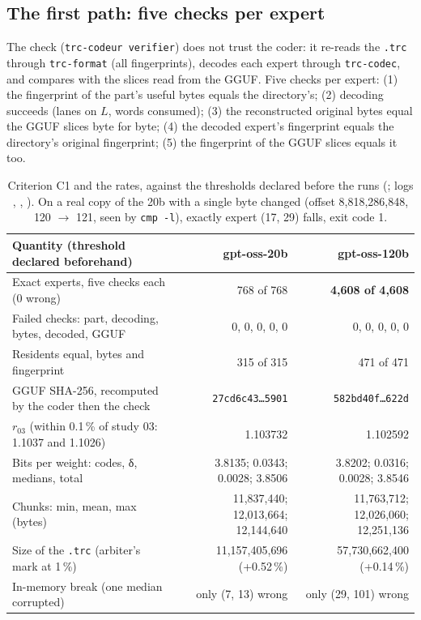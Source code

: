 \subsection{The first path: five checks per expert}

The check (\texttt{trc-codeur verifier}) does not trust the coder: it re-reads the \texttt{.trc} through \texttt{trc-format} (all fingerprints), decodes each expert through \texttt{trc-codec}, and compares with the slices read from the GGUF. Five checks per expert: (1) the fingerprint of the part's useful bytes equals the directory's; (2) decoding succeeds (lanes on $L$, words consumed); (3) the reconstructed original bytes equal the GGUF slices byte for byte; (4) the decoded expert's fingerprint equals the directory's original fingerprint; (5) the fingerprint of the GGUF slices equals it too.

\begin{table}[ht]
\centering\small
\begin{tabularx}{\linewidth}{>{\raggedright\arraybackslash}X r r}
\toprule
Quantity (threshold declared beforehand) & gpt-oss-20b & gpt-oss-120b \\
\midrule
Exact experts, five checks each (0 wrong) & 768 of 768 & \textbf{4{,}608 of 4{,}608} \\
Failed checks: part, decoding, bytes, decoded, GGUF & 0, 0, 0, 0, 0 & 0, 0, 0, 0, 0 \\
Residents equal, bytes and fingerprint & 315 of 315 & 471 of 471 \\
GGUF SHA-256, recomputed by the coder then the check & \texttt{27cd6c43…5901} & \texttt{582bd40f…622d} \\
$r_{03}$ (within 0.1\,\% of study 03: 1.1037 and 1.1026) & 1.103732 & 1.102592 \\
Bits per weight: codes, δ, medians, total & 3.8135; 0.0343; 0.0028; 3.8506 & 3.8202; 0.0316; 0.0028; 3.8546 \\
Chunks: min, mean, max (bytes) & 11{,}837{,}440; 12{,}013{,}664; 12{,}144{,}640 & 11{,}763{,}712; 12{,}026{,}060; 12{,}251{,}136 \\
Size of the \texttt{.trc} (arbiter's mark at 1\,\%) & 11{,}157{,}405{,}696 (+0.52\,\%) & 57{,}730{,}662{,}400 (+0.14\,\%) \\
In-memory break (one median corrupted) & only (7, 13) wrong & only (29, 101) wrong \\
\bottomrule
\end{tabularx}
\caption[C1: the verdict]{Criterion C1 and the rates, against the thresholds declared before the runs (; logs , , ). On a real copy of the 20b with a single byte changed (offset 8{,}818{,}286{,}848, 120 $\to$ 121, seen by \texttt{cmp -l}), exactly expert (17, 29) falls, exit code 1.}
\label{t2fmt:tab:cun}
\end{table}

